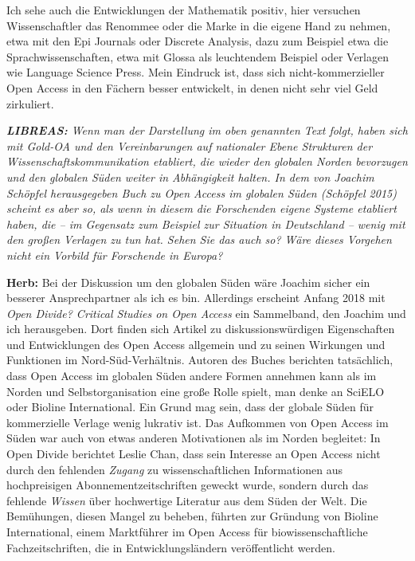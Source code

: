 \documentclass[a4paper,
fontsize=11pt,
oneside,
numbers=noperiodatend,
parskip=half-,
bibliography=totoc,
final
]{scrartcl}
\begin{document}
Ich sehe auch die Entwicklungen der Mathematik positiv, hier versuchen
Wissenschaftler das Renommee oder die Marke in die eigene Hand zu
nehmen, etwa mit den Epi Journals oder Discrete Analysis, dazu zum
Beispiel etwa die Sprachwissenschaften, etwa mit Glossa als leuchtendem
Beispiel oder Verlagen wie Language Science Press. Mein Eindruck ist,
dass sich nicht-kommerzieller Open Access in den Fächern besser
entwickelt, in denen nicht sehr viel Geld zirkuliert.

\emph{\textbf{LIBREAS:} Wenn man der Darstellung im oben genannten Text
folgt, haben sich mit Gold-OA und den Vereinbarungen auf nationaler
Ebene Strukturen der Wissenschaftskommunikation etabliert, die wieder
den globalen Norden bevorzugen und den globalen Süden weiter in
Abhängigkeit halten. In dem von Joachim Schöpfel herausgegeben Buch zu
Open Access im globalen Süden (Schöpfel 2015) scheint es aber so, als
wenn in diesem die Forschenden eigene Systeme etabliert haben, die -- im
Gegensatz zum Beispiel zur Situation in Deutschland -- wenig mit den
großen Verlagen zu tun hat. Sehen Sie das auch so? Wäre dieses Vorgehen
nicht ein Vorbild für Forschende in Europa?}

\textbf{Herb:} Bei der Diskussion um den globalen Süden wäre Joachim
sicher ein besserer Ansprechpartner als ich es bin. Allerdings erscheint
Anfang 2018 mit \emph{Open Divide? Critical Studies on Open Access} ein
Sammelband, den Joachim und ich herausgeben. Dort finden sich Artikel zu
diskussionswürdigen Eigenschaften und Entwicklungen des Open Access
allgemein und zu seinen Wirkungen und Funktionen im Nord-Süd-Verhältnis.
Autoren des Buches berichten tatsächlich, dass Open Access im globalen
Süden andere Formen annehmen kann als im Norden und Selbstorganisation
eine große Rolle spielt, man denke an SciELO oder Bioline International.
Ein Grund mag sein, dass der globale Süden für kommerzielle Verlage
wenig lukrativ ist. Das Aufkommen von Open Access im Süden war auch von
etwas anderen Motivationen als im Norden begleitet: In Open Divide
berichtet Leslie Chan, dass sein Interesse an Open Access nicht durch
den fehlenden \emph{Zugang} zu wissenschaftlichen Informationen aus
hochpreisigen Abonnementzeitschriften geweckt wurde, sondern durch das
fehlende \emph{Wissen} über hochwertige Literatur aus dem Süden der
Welt. Die Bemühungen, diesen Mangel zu beheben, führten zur Gründung von
Bioline International, einem Marktführer im Open Access für
biowissenschaftliche Fachzeitschriften, die in Entwicklungsländern
veröffentlicht werden.
\end{document}
